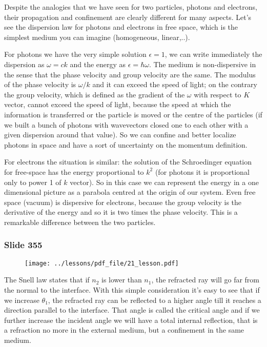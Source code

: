 \documentclass[../main/main.tex]{subfiles}
\begin{document}
Despite the analogies that we have seen for two particles, photons and electrons, their propagation and confinement are clearly different for many aspects. 
Let's see the dispersion law for photons and electrons in free space, which is the simplest medium you can imagine (homogeneous, linear,..).

For photons we have the very simple solution $\epsilon = 1$, we can write immediately the dispersion as $\omega=c k$ and the energy as $\epsilon = \hbar \omega$. The medium is non-dispersive in the sense that the phase velocity and group velocity are the same. The modulus of the phase velocity is $\omega / k$ and it can exceed the speed of light; on the contrary the group velocity, which is defined as the gradient of the $\omega$ with respect to $K$ vector, cannot exceed the speed of light, because the speed at which the information is transferred or the particle is moved or the centre of the particles (if we built a bunch of photons with wavevectors closed one to each other with a given dispersion around that value).
So we can confine and better localize photons in space and have a sort of uncertainty on the momentum definition.

For electrons the situation is similar: the solution of the Schroedinger equation for free-space has the energy proportional to $k^2$ (for photons it is proportional only to power 1 of $k$ vector). So in this case we can represent the energy in a one dimensional picture as a parabola centred at the origin of our system.
Even free space (vacuum) is dispersive for electrons, because the group velocity is the derivative of the energy and so it is two times the phase velocity. This is a remarkable difference between the two particles.

\newpage

\subsubsection{Slide 355}

\begin{figure}[h!]
\centering
\texttt{[image: ../lessons/pdf\_file/21\_lesson.pdf]}
\end{figure}

The Snell law states that if $n_ 2$ is lower than $n_1$, the refracted ray will go far from the normal to the interface. 
With this simple consideration it’s easy to see that if we increase $\theta_1$, the refracted ray can be reflected to a higher angle till it reaches a direction parallel to the interface. That angle is called the critical angle and if we further increase the incident angle we will have a total internal reflection, that is a refraction no more in the external medium, but a confinement in the same medium.
\end{document}
